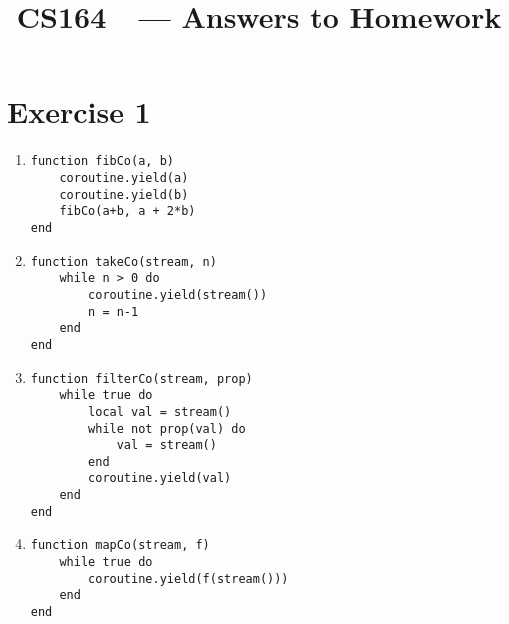 \documentclass[11pt]{article}
\title{CS164\ \Session\  --- Answers to Homework \Homework}
\author{\Name}
\begin{document}
\maketitle
{}
\setcounter{problemnumber}{0}

\section*{Exercise 1}
\begin{enumerate}[(P1)]
\item \begin{verbatim}
function fibCo(a, b)
    coroutine.yield(a)
    coroutine.yield(b)
    fibCo(a+b, a + 2*b)
end
\end{verbatim}
\item \begin{verbatim}
function takeCo(stream, n)
    while n > 0 do
        coroutine.yield(stream())
        n = n-1
    end
end
\end{verbatim}
\item \begin{verbatim}
function filterCo(stream, prop)
    while true do
        local val = stream()
        while not prop(val) do
            val = stream()
        end
        coroutine.yield(val)
    end
end
\end{verbatim}
\item \begin{verbatim}
function mapCo(stream, f)
    while true do
        coroutine.yield(f(stream()))
    end
end
\end{verbatim}
\end{enumerate}


\newpage
\end{document}
